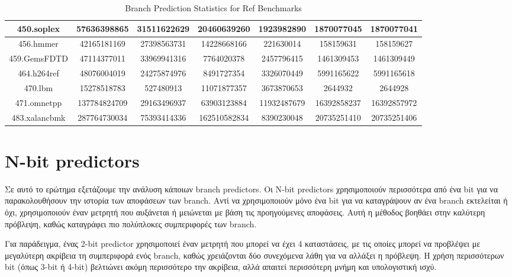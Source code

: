\documentclass{article}
\begin{document}
\begin{table}[H]
\begin{tabular}{|c|c|c|c|c|c|c|}
    \hline
    450.soplex &  57636398865 & 31511622629 & 20460639260 & 1923982890 & 1870077045 & 1870077041 \\
    \hline
    456.hmmer &  42165181169 & 27398563731 & 14228668166 & 221630014 & 158159631 & 158159627 \\
    \hline
    459.GemsFDTD &  47114377011 & 33969941316 & 7764020378 & 2457796415 & 1461309453 & 1461309449 \\
    \hline
    464.h264ref &  48076004019 & 24275874976 & 8491727354 & 3326070449 & 5991165622 & 5991165618 \\
    \hline
    470.lbm &  15278518783 & 527480913 & 11071877357 & 3673870653 & 2644932 & 2644928 \\
    \hline
    471.omnetpp &  137784824709 & 29163496937 & 63903123884 & 11932487679 & 16392858237 & 16392857972 \\
    \hline
    483.xalancbmk & 287764730034 & 75393414336 & 162510582834 & 8390230048 & 20735251410 & 20735251406 \\
    \hline

\end{tabular}
\caption{Branch Prediction Statistics for Ref Benchmarks}
\end{table}

\section{Ν-bit predictors}
Σε αυτό το ερώτημα εξετάζουμε την ανάλυση κάποιων branch predictors. Οι N-bit predictors χρησιμοποιούν περισσότερα από ένα bit για να παρακολουθήσουν την ιστορία των αποφάσεων των branch. Αντί να χρησιμοποιούν μόνο ένα bit για να καταγράψουν αν ένα branch εκτελείται ή όχι, χρησιμοποιούν έναν μετρητή που αυξάνεται ή μειώνεται με βάση τις προηγούμενες αποφάσεις. Αυτή η μέθοδος βοηθάει στην καλύτερη πρόβλεψη, καθώς καταγράφει πιο πολύπλοκες συμπεριφορές των branch.

Για παράδειγμα, ένας 2-bit predictor χρησιμοποιεί έναν μετρητή που μπορεί να έχει 4 καταστάσεις, με τις οποίες μπορεί να προβλέψει με μεγαλύτερη ακρίβεια τη συμπεριφορά ενός branch, καθώς χρειάζονται δύο συνεχόμενα λάθη για να αλλάξει η πρόβλεψη. Η χρήση περισσότερων bit (όπως 3-bit ή 4-bit) βελτιώνει ακόμη περισσότερο την ακρίβεια, αλλά απαιτεί περισσότερη μνήμη και υπολογιστική ισχύ.
\end{document}
